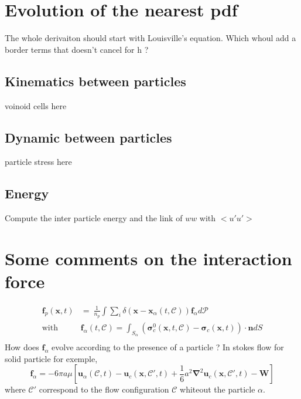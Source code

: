 \documentclass[12pt]{My_preprint}
\newcommand{\nablab}{\mathbf{\nabla}}
\newcommand{\CC}{\mathscr{C}}
\newcommand{\PP}{\mathscr{P}}
\begin{document}
\section{Evolution of the nearest pdf}
The whole derivaiton should start with Louisville's equation. 
Which whoul add a border terms that doesn't cancel for h ? 










\subsection{Kinematics between particles}
voinoid cells here
\subsection{Dynamic between particles}
particle stress here
\subsection{Energy}
Compute the inter particle energy and the link of $ww$ with $<u'u'>$ 

\section{Some comments on the interaction force}
\begin{align}
    \textbf{f}_p (\textbf{x},t) &= \
    \frac{1}{n_p}\int \sum_i \delta(\textbf{x} - \textbf{x}_\alpha(t,\CC)) \textbf{f}_\alpha d\PP\\
    \label{eq:f_alpha}
    \text{with} \;\;\; &\textbf{f}_\alpha(t,\CC) = \int_{S_\alpha} (\bm{\sigma}_c^0(\textbf{x},t,\CC) - \bm{\sigma}_c(\textbf{x},t) )\cdot \textbf{n} dS \\
\end{align}
How does $\textbf{f}_\alpha$ evolve according to the presence of a particle ? 
In stokes flow for solid particle for exemple, 
\begin{equation}
    \textbf{f}_\alpha
    = - 6 \pi a \mu [
        \textbf{u}_\alpha(\CC,t)
        - \textbf{u}_c(\textbf{x},\CC',t)
        + \frac{1}{6}a^2 \nablab^2\textbf{u}_c(\textbf{x},\CC',t)
        - \textbf{W}
    ]
\end{equation}
where $\CC'$ correspond to the flow configuration $\CC$ whiteout the particle $\alpha$. 
\end{document}
